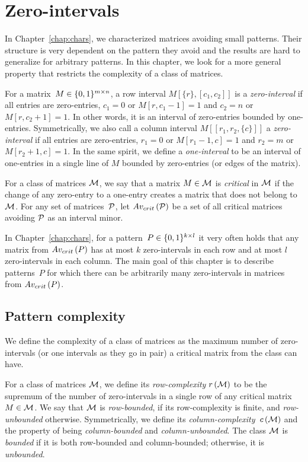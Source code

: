 \chapter{Zero-intervals}
\label{chap:ints}
In Chapter~\ref{chap:chars}, we characterized matrices avoiding small patterns. Their structure is very dependent on the pattern they avoid and the results are hard to generalize for arbitrary patterns. In this chapter, we look for a more general property that restricts the complexity of a class of matrices.

\begin{defn}
For a matrix~$M\in\{0,1\}^{m\times n}$, a row interval $M[\{r\},[c_1,c_2]]$ is a \emph{zero-interval} if all entries are zero-entries, $c_1=0$ or $M[r,c_1-1]=1$ and $c_2=n$ or $M[r,c_2+1]=1$. In other words, it is an interval of zero-entries bounded by one-entries. Symmetrically, we also call a column interval $M[[r_1,r_2,\{c\}]]$ a \emph{zero-interval} if all entries are zero-entries, $r_1=0$ or $M[r_1-1,c]=1$ and $r_2=m$ or $M[r_2+1,c]=1$. In the same spirit, we define a \emph{one-interval} to be an interval of one-entries in a single line of $M$ bounded by zero-entries (or edges of the matrix).
\end{defn}

\begin{defn}
For a class of matrices $\mathcal{M}$, we say that a matrix $M\in\mathcal{M}$ is \emph{critical} in $\mathcal{M}$ if the change of any zero-entry to a one-entry creates a matrix that does not belong to $\mathcal{M}$. For any set of matrices~$\mathcal{P}$, let $Av_{crit}\left(\mathcal{P}\right)$ be a set of all critical matrices avoiding $\mathcal{P}$ as an interval minor.
\end{defn}

In Chapter~\ref{chap:chars}, for a pattern~$P\in\{0,1\}^{k\times l}$ it very often holds that any matrix from $Av_{crit}\left(P\right)$ has at most $k$ zero-intervals in each row and at most $l$ zero-intervals in each column. The main goal of this chapter is to describe patterns~$P$ for which there can be arbitrarily many zero-intervals in matrices from $Av_{crit}\left(P\right)$.

\section{Pattern complexity}
We define the complexity of a class of matrices as the maximum number of zero-intervals (or one intervals as they go in pair) a critical matrix from the class can have.

\begin{defn}
For a class of matrices $\mathcal{M}$, we define its \emph{row-complexity} $r\left(\mathcal{M}\right)$ to be the supremum of the number of zero-intervals in a single row of any critical matrix~$M\in\mathcal{M}$. We say that $\mathcal{M}$ is \emph{row-bounded}, if its row-complexity is finite, and \emph{row-unbounded} otherwise. Symmetrically, we define its \emph{column-complexity}~$c\left(\mathcal{M}\right)$ and the property of being \emph{column-bounded} and \emph{column-unbounded}. The class $\mathcal{M}$ is \emph{bounded} if it is both row-bounded and column-bounded; otherwise, it is \emph{unbounded}.
\end{defn}


